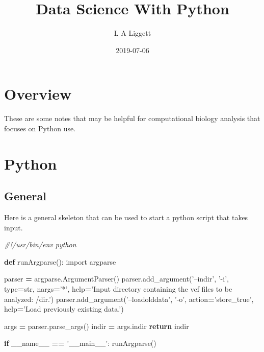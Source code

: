 \documentclass[]{book}
\title{Data Science With Python}
\author{L A Liggett}
\date{2019-07-06}
\newenvironment{Shaded}{\begin{snugshade}}{\end{snugshade}}
\newcommand{\KeywordTok}[1]{\textcolor[rgb]{0.13,0.29,0.53}{\textbf{#1}}}
\newcommand{\StringTok}[1]{\textcolor[rgb]{0.31,0.60,0.02}{#1}}
\newcommand{\ImportTok}[1]{#1}
\newcommand{\CommentTok}[1]{\textcolor[rgb]{0.56,0.35,0.01}{\textit{#1}}}
\newcommand{\VariableTok}[1]{\textcolor[rgb]{0.00,0.00,0.00}{#1}}
\newcommand{\ControlFlowTok}[1]{\textcolor[rgb]{0.13,0.29,0.53}{\textbf{#1}}}
\newcommand{\OperatorTok}[1]{\textcolor[rgb]{0.81,0.36,0.00}{\textbf{#1}}}
\newcommand{\BuiltInTok}[1]{#1}
\newcommand{\NormalTok}[1]{#1}
\begin{document}
\maketitle

{
\setcounter{tocdepth}{1}
\tableofcontents
}
\chapter{Overview}\label{overview}

These are some notes that may be helpful for computational biology
analysis that focuses on Python use.

\chapter{Python}\label{python}

\section{General}\label{general}

Here is a general skeleton that can be used to start a python script
that takes input.

\begin{Shaded}
\begin{Highlighting}[]
\CommentTok{#!/usr/bin/env python}

\KeywordTok{def}\NormalTok{ runArgparse():}
\ImportTok{import}\NormalTok{ argparse}

\NormalTok{parser }\OperatorTok{=}\NormalTok{ argparse.ArgumentParser()}
\NormalTok{parser.add_argument(}\StringTok{'--indir'}\NormalTok{, }\StringTok{'-i'}\NormalTok{, }\BuiltInTok{type}\OperatorTok{=}\BuiltInTok{str}\NormalTok{, nargs}\OperatorTok{=}\StringTok{'*'}\NormalTok{, }\BuiltInTok{help}\OperatorTok{=}\StringTok{'Input directory containing the vcf files to be analyzed: /dir.'}\NormalTok{)}
\NormalTok{parser.add_argument(}\StringTok{'--loadolddata'}\NormalTok{, }\StringTok{'-o'}\NormalTok{, action}\OperatorTok{=}\StringTok{'store_true'}\NormalTok{, }\BuiltInTok{help}\OperatorTok{=}\StringTok{'Load previously existing data.'}\NormalTok{)}

\NormalTok{args }\OperatorTok{=}\NormalTok{ parser.parse_args()}
\NormalTok{indir }\OperatorTok{=}\NormalTok{ args.indir}
\ControlFlowTok{return}\NormalTok{ indir}

\ControlFlowTok{if} \VariableTok{__name__} \OperatorTok{==} \StringTok{'__main__'}\NormalTok{:}
\NormalTok{    runArgparse()}
\end{Highlighting}
\end{Shaded}
\end{document}
